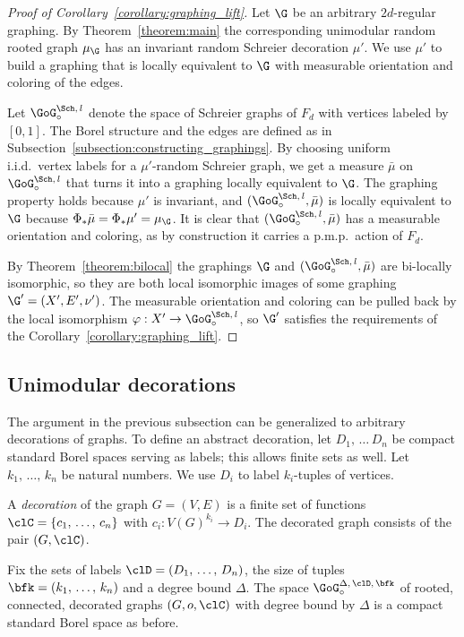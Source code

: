 \begin{proof}[Proof of Corollary~\ref{corollary:graphing_lift}]
Let $\G$ be an arbitrary $2d$-regular graphing. By Theorem~\ref{theorem:main} the corresponding unimodular random rooted graph $\mu_{\G}$ has an invariant random Schreier decoration $\mu'$. We use $\mu'$ to build a graphing that is locally equivalent to $\G$ with measurable orientation and coloring of the edges.

Let $\GoG_{\circ}^{\Sch,\,l}$ denote the space of Schreier graphs of $F_d$ with vertices labeled by $[0,1]$. The Borel structure and the edges are defined as in Subsection~\ref{subsection:constructing_graphings}. By choosing uniform i.i.d.\ vertex labels for a $\mu'$-random Schreier graph, we get a measure $\bar{\mu}$ on $\GoG_{\circ}^{\Sch,\,l}$ that turns it into a graphing locally equivalent to $\G$. The graphing property holds because $\mu'$ is invariant, and $(\GoG_{\circ}^{\Sch,\,l}, \bar{\mu})$ is locally equivalent to $\G$ because $\Phi_{*}\bar{\mu}=\Phi_{*}\mu'=\mu_{\G}$. It is clear that $(\GoG_{\circ}^{\Sch,\,l}, \bar{\mu})$ has a measurable orientation and coloring, as by construction it carries a p.m.p.\ action of $F_d$.

By Theorem~\ref{theorem:bilocal} the graphings $\G$ and $(\GoG_{\circ}^{\Sch,\,l}, \bar{\mu})$ are bi-locally isomorphic, so they are both local isomorphic images of some graphing $\G'=(X', E', \nu')$. The measurable orientation and coloring can be pulled back by the local isomorphism $\varphi: X' \to \GoG_{\circ}^{\Sch,\,l}$, so $\G'$ satisfies the requirements of the Corollary~\ref{corollary:graphing_lift}.
\end{proof}

\subsection{Unimodular decorations}

The argument in the previous subsection can be generalized to arbitrary decorations of graphs. To define an abstract decoration, let $D_1,\,\ldots \,D_n$ be compact standard Borel spaces serving as labels; this allows finite sets as well. Let $k_1, \,\ldots,\,k_n$ be natural numbers. We use $D_i$ to label $k_i$-tuples of vertices.

A \emph{decoration} of the graph $G=(V,E)$ is a finite set of functions $\clC=\{c_1,\,\ldots,\,c_n\}$ with $c_i:V(G)^{k_i} \to D_i$. The decorated graph consists of the pair $(G,\clC)$.

Fix the sets of labels $\clD= (D_1,\,\dots,\,D_n)$, the size of tuples $\bfk=(k_1,\,\ldots,\,k_n)$ and a degree bound $\Delta$. The space $\GoG_{\circ}^{\Delta,\,\clD,\,\bfk}$ of rooted, connected, decorated graphs $(G,o,\clC)$ with degree bound by $\Delta$ is a compact standard Borel space as before.

